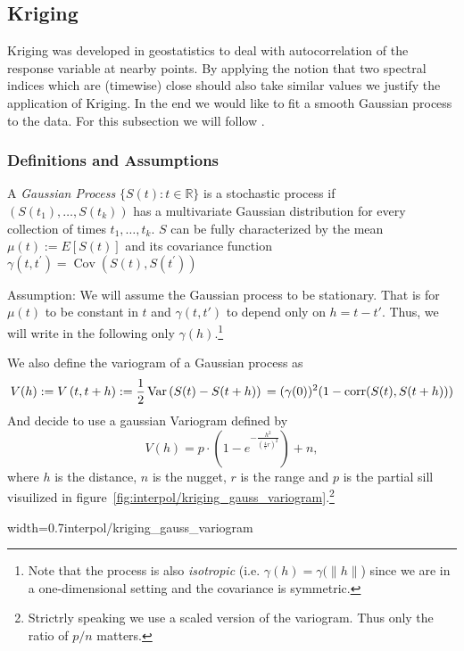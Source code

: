 \subsection{Kriging}
\label{sec:Kriging}

Kriging was developed in geostatistics to deal with autocorrelation of the response variable at nearby points. By applying the notion that two spectral indices which are (timewise) close should also take similar values we justify the application of Kriging. In the end we would like to fit a smooth Gaussian process to the data. For this subsection we will follow \cite{diggleGaussianModelsGeostatistical2007}.

\subsubsection*{Definitions and Assumptions}

A \textit{Gaussian Process} $\{S(t) : t\in \mathbb R\} $ is a stochastic process if $(S(t_1),\dots,S(t_k))$ has a multivariate Gaussian distribution for every collection of times ${t_1, \dots , t_k}$.
$S$ can be fully characterized by the mean $\mu(t):=E[S(t)]$ and its covariance function $\gamma\left(t, t^{\prime}\right)=\operatorname{Cov}\left(S(t), S\left(t^{\prime}\right)\right)$

Assumption:
We will assume the Gaussian process to be stationary. That is for $\mu(t)$ to be constant in $t$ and $\gamma(t,t')$ to depend only on $h=t-t'$. Thus, we will write in the following only $\gamma(h)$.\footnote{Note that the process is also \textit{isotropic} (i.e. $\gamma(h)=\gamma(\|h\|$) since we are in a one-dimensional setting and the covariance is symmetric.}


We also define the variogram of a Gaussian process as
$$V(h):=V\left(t, t+h\right):=\frac{1}{2} \operatorname{Var}\left(S(t)-S(t+h)\right)\\ %
  =(\gamma(0))^2(1-\operatorname{corr}(S(t),S(t+h)))
$$
And decide to use a gaussian Variogram defined by
$$V(h) = p \cdot\left(1-e^{-\frac{h^{2}}{\left(\frac{4}{7} r\right)^{2}}}\right)+n,$$
where $h$ is the distance, $n$ is the nugget, $r$ is the range and $p$ is the partial sill visuilized in figure~\ref{fig:interpol/kriging_gauss_variogram}.\footnote{Strictrly speaking we use a scaled version of the variogram. Thus only the ratio of $p/n$ matters.}
\begin{my_figure}[h]{width=0.7\textwidth}{interpol/kriging_gauss_variogram}
  \caption{Gaussian Variogram with nugget=1, partial sill=3, range=55}
  \label{fig:interpol/kriging_gauss_variogram}
\end{my_figure}

